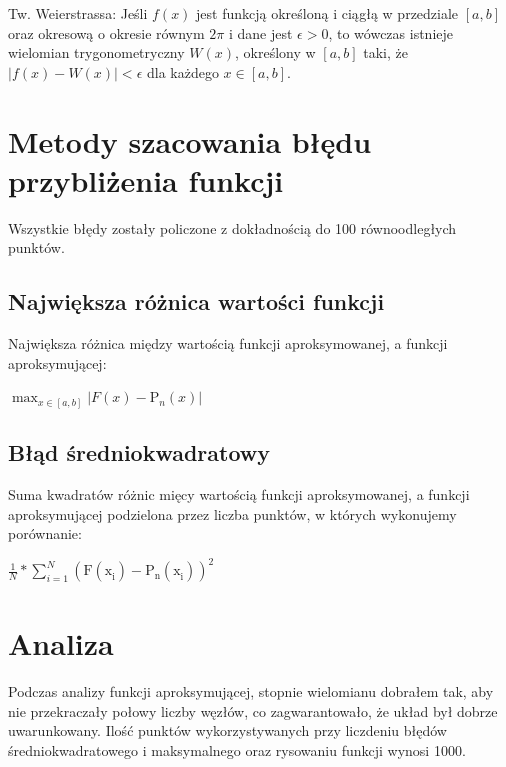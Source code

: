 \documentclass{article}
\begin{document}
\noindent
Tw. Weierstrassa: Jeśli \( f(x) \) jest funkcją określoną i ciągłą w przedziale \( [a, b] \) oraz okresową o okresie równym \( 2\pi \) i dane jest \( \epsilon > 0 \), to wówczas istnieje wielomian trygonometryczny \( W(x) \), określony w \( [a, b] \) taki, że \( |f(x) - W(x)| < \epsilon \) dla każdego \( x \in [a, b] \).

\section{Metody szacowania błędu przybliżenia funkcji}

Wszystkie błędy zostały policzone z dokładnością do 100 równoodległych punktów.

\subsection{Największa różnica wartości funkcji}

Największa różnica między wartością funkcji aproksymowanej, a funkcji aproksymującej:

\begin{center}
    \(\max_{x\in [a, b]} |F(x) - \mathrm{P}_{n}^{}(x)|\)
\end{center}

\subsection{Błąd średniokwadratowy}

Suma kwadratów różnic mięcy wartością funkcji aproksymowanej, a funkcji aproksymującej podzielona przez liczba punktów, w których wykonujemy porównanie:

\begin{center}
\(\frac{1}{N} * \sum_{i = 1}^{N}\mathrm{(F(\mathrm{x}_{i}^{}) - \mathrm{P}_{n}^{}(\mathrm{x}_{i}^{}))}_{}^{2}\)
\end{center}

\section{Analiza}

Podczas analizy funkcji aproksymującej, stopnie wielomianu dobrałem tak, aby nie przekraczały połowy liczby węzłów, co zagwarantowało, że układ był dobrze uwarunkowany.
\noindent
Ilość punktów wykorzystywanych przy liczdeniu błędów średniokwadratowego i maksymalnego oraz rysowaniu funkcji wynosi 1000.

\newpage
\end{document}
